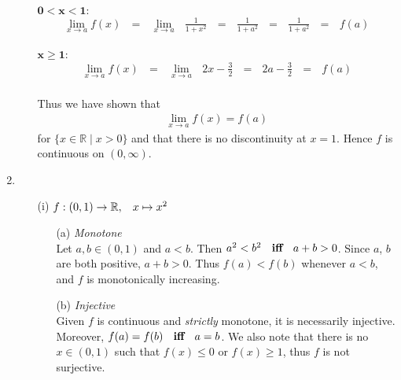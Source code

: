 \documentclass[12pt]{amsart}
\begin{document}
\begin{enumerate}
\begin{enumerate}
				$\mathbf{0<x<1:}$
				\begin{eqnarray}
					\lim_{x \rightarrow a} f(x) \text{ } = \text{ } \lim_{x \rightarrow a} \text{ } \frac{1}{1+x^2} 						\text{ } = \text{ } \frac{1}{1+a^2} \text{ } = \text{ } \frac{1}{1+a^2} \text{ } = \text{ } f(a) 						\nonumber
				\end{eqnarray}\\
				$\mathbf{x\ge1:}$
				\begin{eqnarray}
					\lim_{x \rightarrow a} f(x) \text{ } = \text{ } \lim_{x \rightarrow a} \text{ }2x - \frac{3}{2} 						\text{ } = \text{ } 2a - \frac{3}{2} \text{ } = \text{ } f(a) \nonumber
				\end{eqnarray}\\
				Thus we have shown that
				\begin{eqnarray}
					\lim_{x \rightarrow a} f(x) = f(a) \nonumber
				\end{eqnarray}
				for $\{x \in \mathbb{R} \mid x > 0\}$ and that there is no discontinuity at $x=1$.  Hence $f$ 				is continuous on $(0,\infty)$.\\			
				
		\end{enumerate}
	
	\item
	
		\begin{enumerate}
		
			\item[(i)] $f: (0,1) \rightarrow \mathbb{R}, \hspace{0.3cm} x \mapsto x^2$\\
				
				\begin{enumerate}
				
					\item[(a)] \emph{Monotone}\\ 
					Let $a,b \in (0,1)$ and $a<b$. Then $a^2 < b^2 \hspace{0.2cm} \textbf{ iff }							\hspace{0.2cm} a+b > 0$.
					Since $a$, $b$ are both positive, $a+b>0$. Thus $f(a) < f(b)$ whenever
					$a<b$, and $f$ is monotonically increasing.\\		
					
					\item[(b)] \emph{Injective}\\
					Given $f$ is continuous and \emph{strictly} monotone, it is necessarily injective. 						Moreover, $f(a) = f(b) \hspace{0.2cm} \textbf{ iff } \hspace{0.2cm} a = b$. We also 						note that there is no $x \in (0,1)$ such that $f(x) \le 0$ or $f(x) \ge 1$, thus $f$ is 						not surjective.\\
					

\end{enumerate}
\end{enumerate}
\end{enumerate}
\end{document}

